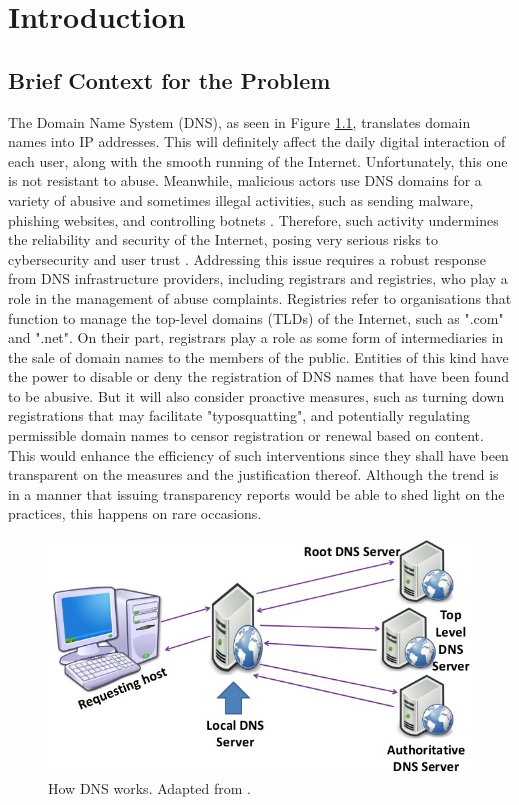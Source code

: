 \chapter{Introduction}


\section{Brief Context for the Problem}

The Domain Name System (DNS), as seen in Figure \ref{fig:dnsIntro}, translates domain names into IP addresses. This will definitely affect the daily digital interaction of each user, along with the smooth running of the Internet. Unfortunately, this one is not resistant to abuse. Meanwhile, malicious actors use DNS domains for a variety of abusive and sometimes illegal activities, such as sending malware, phishing websites, and controlling botnets \cite{so2022}. Therefore, such activity undermines the reliability and security of the Internet, posing very serious risks to cybersecurity and user trust \cite{bayer2022}. Addressing this issue requires a robust response from DNS infrastructure providers, including registrars and registries, who play a role in the management of abuse complaints. Registries refer to organisations that function to manage the top-level domains (TLDs) of the Internet, such as ".com" and ".net". On their part, registrars play a role as some form of intermediaries in the sale of domain names to the members of the public. Entities of this kind have the power to disable or deny the registration of DNS names that have been found to be abusive. But it will also consider proactive measures, such as turning down registrations that may facilitate "typosquatting", and potentially regulating permissible domain names to censor registration or renewal based on content. This would enhance the efficiency of such interventions since they shall have been transparent on the measures and the justification thereof. Although the trend is in a manner that issuing transparency reports would be able to shed light on the practices, this happens on rare occasions.

\begin{figure}[H]
    \centering
    \includegraphics[width=0.4\linewidth]{introduction/dnsWork.jpg}
    \caption{How DNS works. Adapted from \cite{blanche2018understandingDNS}. }
    \label{fig:dnsIntro}
\end{figure}


